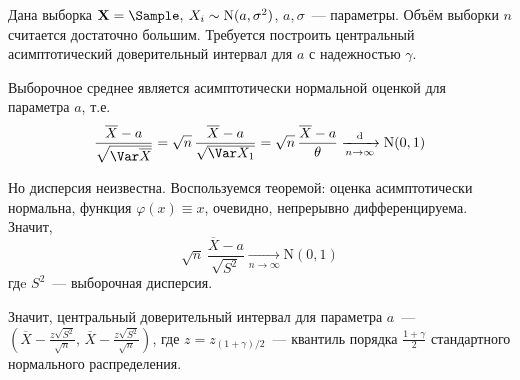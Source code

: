 \begin{exmp}
    Дана выборка $\mathbf{X} = \Sample, \: X_i \sim \mathrm{N}(a, \sigma^2)$, $a, \sigma$~--- параметры.
    Объём выборки $n$ считается достаточно большим. 
    Требуется построить центральный асимптотический доверительный интервал для $a$ с надежностью $\gamma$.

    Выборочное среднее является асимптотически нормальной оценкой для параметра $a$, т.е.
    \begin{equation*}
        \frac{\overline{X} - a}{\sqrt{\Var \overline{X}}} = 
        \sqrt{n} \, \frac{\overline{X} - a}{\sqrt{\Var X_1}} = 
        \sqrt{n} \, \frac{\overline{X} - a}{\theta} 
        \xrightarrow[n \to \infty]{\text{d}}
        \mathrm{N}(0, 1)
    \end{equation*}

    Но дисперсия неизвестна.
    Воспользуемся теоремой: оценка асимптотически нормальна, функция $\varphi(x) \equiv x$, очевидно, непрерывно дифференцируема.
    Значит, 
    \begin{equation*}
        \sqrt{n} \, \frac{\overline{X} - a}{\sqrt{S^2}} 
        \xrightarrow[n \to \infty]{}
        \mathrm{N}(0, 1)
    \end{equation*}
    гдe $S^2$~--- выборочная дисперсия.

    Значит, центральный доверительный интервал для параметра $a$~--- 
    $\left(\overline{X} - \frac{z \sqrt{S^2}}{\sqrt{n}}, \, \overline{X} - \frac{z \sqrt{S^2}}{\sqrt{n}}\right)$,
    где $z = z_{(1 + \gamma)/2}$~--- квантиль порядка $\frac{1 + \gamma}{2}$ стандартного нормального распределения.
\end{exmp}
